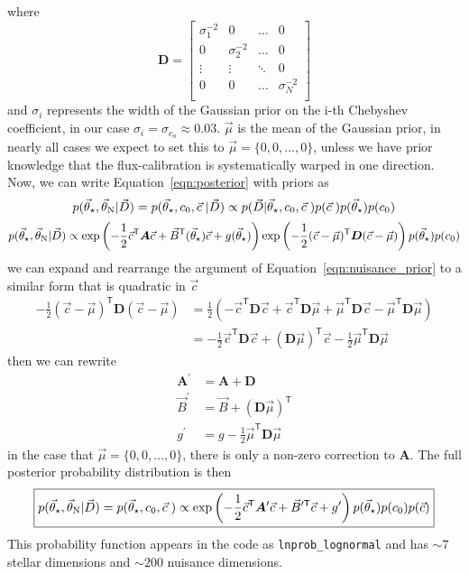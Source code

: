 \documentclass[preprint]{aastex} %
\newcommand{\vt}{\vec{\theta}}
\newcommand{\vstar}{\vt_{\star}}
\newcommand{\vN}{\vt_{\rm N}}
\newcommand{\vc}{\vec{c}}
\newcommand{\vD}{\vec{D}}
\newcommand{\trans}{\mathsf{T}}
\begin{document}
where 
\begin{equation}
  {\bm D} = 
  \begin{bmatrix}
    \sigma_1^{-2} & 0 & \hdots & 0 \\
    0 & \sigma_2^{-2} & \hdots & 0 \\
    \vdots & \vdots & \ddots & 0 \\
    0 & 0 & \hdots & \sigma_N^{-2} \\
  \end{bmatrix}
\end{equation}
and $\sigma_i$ represents the width of the Gaussian prior on the i-th Chebyshev coefficient, in our case $\sigma_i = \sigma_{c_n} \approx 0.03$. $\vec{\mu}$ is the mean of the Gaussian prior, in nearly all cases we expect to set this to $\vec{\mu} = \{0, 0, \ldots, 0\}$, unless we have prior knowledge that the flux-calibration is systematically warped in one direction. Now, we can write Equation~\ref{eqn:posterior} with priors as
\begin{equation}
  p(\vstar, \vN | \vD) = p(\vstar, c_0, \vc\; | \vD) \propto p( \vD | \vstar, c_0, \vc\; ) p(\vc\;) p(\vstar) p(c_0) 
\end{equation}
\begin{equation}
  p(\vstar, \vN | \vD) \propto \exp \left ( - \frac{1}{2} \vc^\trans {\bm A} \vc + \vec{B}^\trans(\vstar) \vc + g(\vstar) \right )  \exp \left ( -\frac{1}{2} (\vc - \vec{\mu})^\trans {\bm D} (\vc - \vec{\mu}) \right ) p(\vstar) p(c_0)
  \label{eqn:posterior_prior}
\end{equation}
we can expand and rearrange the argument of Equation~\ref{eqn:nuisance_prior} to a similar form that is quadratic in $\vc$
\begin{align}
  -\frac{1}{2} (\vc - \vec{\mu})^\trans {\bm D} (\vc - \vec{\mu}) &= \frac{1}{2}\left ( -\vc^\trans {\bm D} \vc + \vc^\trans {\bm D} \vec{\mu} + \vec{\mu}^\trans {\bm D} \vc - \vec{\mu}^\trans {\bm D} \vec{\mu} \right )\\
  &= -\frac{1}{2} \vc^\trans {\bm D} \vc + ({\bm D} \vec{\mu})^\trans \vc - \frac{1}{2} \vec{\mu}^\trans {\bm D} \vec{\mu}
\end{align}
then we can rewrite
\begin{align}
  {\bm A}^\prime &= {\bm A} + {\bm D}\\
  \vec{B}^\prime &= \vec{B} + ({\bm D} \vec{\mu})^\trans\\
  g^\prime &= g - \frac{1}{2} \vec{\mu}^\trans {\bm D} \vec{\mu} 
\end{align}
in the case that $\vec{\mu} = \{0, 0, \ldots, 0\}$, there is only a non-zero correction to ${\bm A}$. The full posterior probability distribution is then
 \begin{equation}
   \boxed{
  p(\vstar, \vN | \vD) = p(\vstar, c_0, \vc\;) \propto \exp \left ( - \frac{1}{2} \vc^\trans {\bm A}^\prime \vc + \vec{B}^{\prime \trans} \vc + g^\prime \right ) p(\vstar) p(c_0) p(\vc)
}
\end{equation}
This probability function appears in the code as \texttt{lnprob\_lognormal} and has $\sim 7$ stellar dimensions and $\sim 200$ nuisance dimensions.
\end{document}
